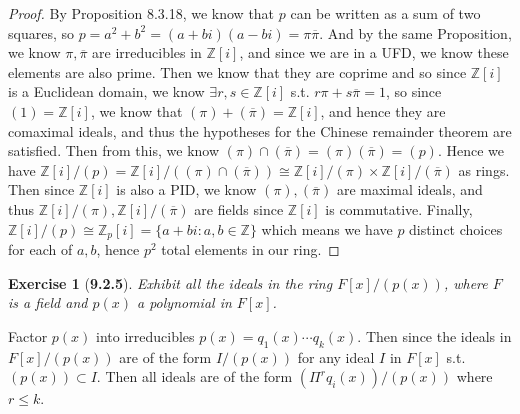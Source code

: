 \documentclass[10pt,oneside,reqno]{amsart}
\theoremstyle{plain}
\newtheorem*{e}{Exercise}
\theoremstyle{definition}
\begin{document}
\begin{enumerate}
\begin{enumerate}
\begin{proof}
By Proposition 8.3.18, we know that $p$ can be written as a sum of two squares, so $p = a^2 + b^2 = (a + bi)(a - bi) = \pi\overline{\pi}$. And by the same Proposition, we know $\pi,\overline{\pi}$ are irreducibles in $\mathbb{Z}[i]$, and since we are in a UFD, we know these elements are also prime. Then we know that they are coprime and so since $\mathbb{Z}[i]$ is a Euclidean domain, we know $\exists r,s \in \mathbb{Z}[i]$ s.t. $r\pi + s \overline{\pi} = 1$, so since $(1) = \mathbb{Z}[i]$, we know that $(\pi) + (\overline{\pi}) = \mathbb{Z}[i]$, and hence they are comaximal ideals, and thus the hypotheses for the Chinese remainder theorem are satisfied. 
Then from this, we know $(\pi) \cap (\overline{\pi}) = (\pi)( \overline{\pi}) = (p)$. Hence we have $\mathbb{Z}[i]/(p) = \mathbb{Z}[i]/((\pi) \cap (\overline{\pi})) \cong \mathbb{Z}[i]/(\pi) \times \mathbb{Z}[i]/(\overline{\pi})$ as rings. Then since $\mathbb{Z}[i]$ is also a PID, we know $(\pi),(\overline{\pi})$ are maximal ideals, and thus $\mathbb{Z}[i]/(\pi),\mathbb{Z}[i]/(\overline{\pi})$ are fields since $\mathbb{Z}[i]$ is commutative. Finally, $\mathbb{Z}[i]/(p) \cong \mathbb{Z}_p[i] = \{a + bi: a,b \in \mathbb{Z}\}$ which means we have $p$ distinct choices for each of $a,b$, hence $p^2$ total elements in our ring. 
\end{proof}
\end{enumerate}

\end{enumerate}
\begin{e}[\textbf{9.2.5}]
Exhibit all the ideals in the ring $F[x]/(p(x))$, where $F$ is a field and $p(x)$ a polynomial in $F[x]$. 
\end{e}
Factor $p(x)$ into irreducibles $p(x) = q_1(x) \cdots q_k(x)$. Then since the ideals in $F[x]/(p(x))$ are of the form $I/(p(x))$ for any ideal $I$ in $F[x]$ s.t. $(p(x)) \subset I$. Then all ideals are of the form $(\Pi^rq_i(x))/(p(x))$ where $r \leq k$. 
\end{document}

